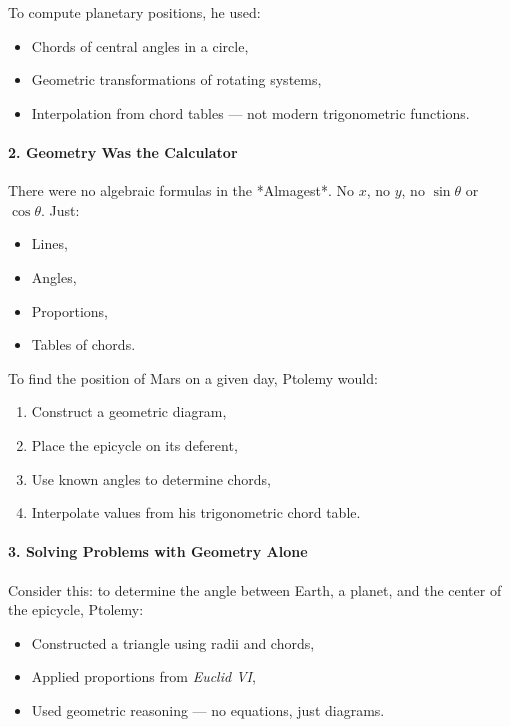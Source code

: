 To compute planetary positions, he used:
\begin{itemize}
    \item Chords of central angles in a circle,
    \item Geometric transformations of rotating systems,
    \item Interpolation from chord tables — not modern trigonometric functions.
\end{itemize}

\paragraph{2. Geometry Was the Calculator}

There were no algebraic formulas in the *Almagest*. No \( x \), no \( y \), no \( \sin \theta \) or \( \cos \theta \). Just:

\begin{itemize}
    \item Lines,
    \item Angles,
    \item Proportions,
    \item Tables of chords.
\end{itemize}

To find the position of Mars on a given day, Ptolemy would:
\begin{enumerate}
    \item Construct a geometric diagram,
    \item Place the epicycle on its deferent,
    \item Use known angles to determine chords,
    \item Interpolate values from his trigonometric chord table.
\end{enumerate}

\paragraph{3. Solving Problems with Geometry Alone}

Consider this: to determine the angle between Earth, a planet, and the center of the epicycle, Ptolemy:
\begin{itemize}
    \item Constructed a triangle using radii and chords,
    \item Applied proportions from \textit{Euclid VI},
    \item Used geometric reasoning — no equations, just diagrams.
\end{itemize}

